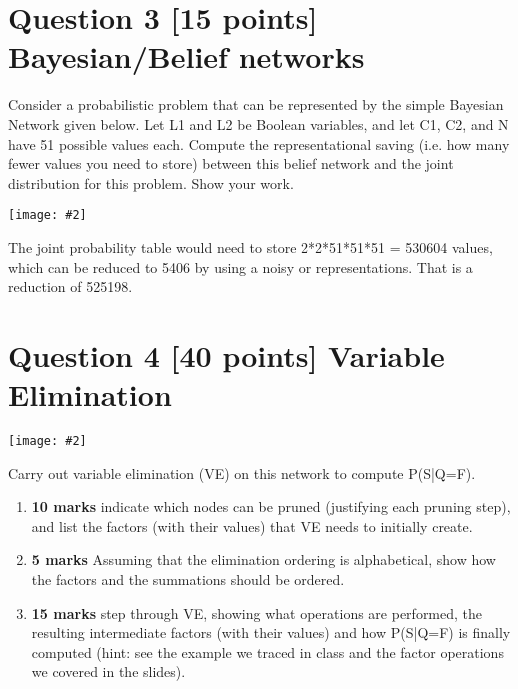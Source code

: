 \documentclass{article}
\def\ans#1{{\color{ans}#1}}
\newcommand{\centerfig}[2]{\begin{center}\texttt{[image: \#2]}\end{center}}
\begin{document}
\clearpage
\section{Question 3 [15 points] Bayesian/Belief networks}
Consider a probabilistic problem that can be represented by the simple Bayesian Network given below. Let L1 and L2 be Boolean variables, and let C1, C2, and N have 51 possible values each. Compute the representational saving (i.e. how many fewer values you need to store) between this belief network and the joint distribution for this problem. Show your work. \\
\centerfig{0.4}{../figs/fig2}
\ans{
    The joint probability table would need to store 2*2*51*51*51 = 530604 values, which 
    can be reduced to 5406 by using a noisy or representations. That is a reduction of 
    525198.
}

\clearpage
\section{Question 4 [40 points] Variable Elimination}
\centerfig{1}{../figs/fig3}
Carry out variable elimination (VE) on this network to compute P(S|Q=F). \\
\begin{enumerate}[label=\arabic*.]
    \item \textbf{10 marks} indicate which nodes can be pruned (justifying each pruning step), and list the factors (with their values) that VE needs to initially create.
    \item \textbf{5 marks} Assuming that the elimination ordering is alphabetical, show how the factors and the summations should be ordered.
    \item \textbf{15 marks} step through VE, showing what operations are performed, the resulting intermediate factors (with their values) and how P(S|Q=F) is finally computed (hint: see the example we traced in class and the factor operations we covered in the slides).
\end{enumerate}
\end{document}
